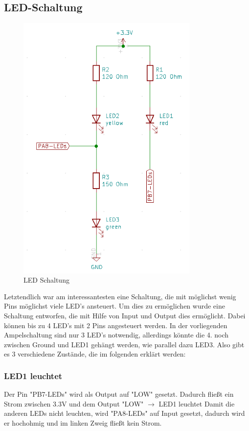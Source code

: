 \documentclass[a4paper,
DIV=13,
12pt,
BCOR=10mm,
department=FakEI,
parskip=half,
automark,
]{article}
\begin{document}
\subsection{LED-Schaltung}
\begin{figure}[!hbpt]
 \begin{center} \includegraphics[width=0.8\textwidth]{LED_Schaltung.png}
 \caption{LED Schaltung}
 \label{fig:Register}
  \end{center}
\end{figure}

\newpage

Letztendlich war am interessantesten eine Schaltung, die mit möglichst wenig Pins möglichst viele LED's ansteuert. Um dies zu ermöglichen wurde eine Schaltung entworfen, die mit Hilfe von Input und Output dies ermöglicht. Dabei können bis zu 4 LED's mit 2 Pins angesteuert werden. In der vorliegenden Ampelschaltung sind nur 3 LED's notwendig, allerdings könnte die 4. noch zwischen Ground und LED1 gehängt werden, wie parallel dazu LED3. Also gibt es 3 verschiedene Zustände, die im folgenden erklärt werden:
\subsubsection{LED1 leuchtet}
Der Pin "PB7-LEDs" wird als Output auf "LOW" gesetzt. Dadurch fließt ein Strom zwischen 3.3V und dem Output "LOW" $\rightarrow$ LED1 leuchtet Damit die anderen LEDs nicht leuchten, wird "PA8-LEDs" auf Input gesetzt, dadurch wird er hochohmig und im linken Zweig fließt kein Strom.
\end{document}
